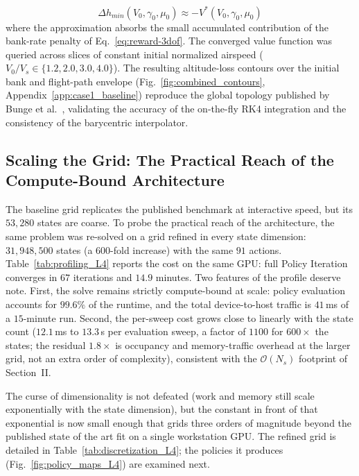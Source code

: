 \documentclass[journal ]{new-aiaa}
\begin{document}
\begin{equation}
    \Delta h_{min}(V_0, \gamma_0, \mu_0) \approx -V^*(V_0, \gamma_0, \mu_0)
\end{equation}
where the approximation absorbs the small accumulated contribution of the bank-rate penalty of Eq.~\eqref{eq:reward-3dof}. The converged value function was queried across slices of constant initial normalized airspeed ($V_0/V_s \in \{1.2, 2.0, 3.0, 4.0\}$). The resulting altitude-loss contours over the initial bank and flight-path envelope (Fig.~\ref{fig:combined_contours}, Appendix~\ref{app:case1_baseline}) reproduce the global topology published by Bunge et al.\ \cite{Bunge2018}, validating the accuracy of the on-the-fly RK4 integration and the consistency of the barycentric interpolator.

\subsection{Scaling the Grid: The Practical Reach of the Compute-Bound
Architecture}
\label{sec:scaling}

The baseline grid replicates the published benchmark at interactive
speed, but its $53{,}280$ states are coarse. To probe the practical
reach of the architecture, the same problem was re-solved on a grid
refined in every state dimension: $31{,}948{,}500$ states (a
$600$-fold increase) with the same $91$ actions.
Table~\ref{tab:profiling_L4} reports the cost on the same GPU: full
Policy Iteration converges in $67$ iterations and $14.9$ minutes.
Two features of the profile deserve note. First, the solve remains
strictly compute-bound at scale: policy evaluation accounts for
$99.6\%$ of the runtime, and the total device-to-host traffic is
$41$\,ms of a $15$-minute run. Second, the per-sweep cost grows
close to linearly with the state count ($12.1$\,ms to $13.3$\,s per
evaluation sweep, a factor of $1100$ for $600\times$ the states; the
residual $1.8\times$ is occupancy and memory-traffic overhead at the
larger grid, not an extra order of complexity), consistent with the
$\mathcal{O}(N_s)$ footprint of Section~II.

The curse of dimensionality is not defeated (work and memory still
scale exponentially with the state dimension), but the constant in
front of that exponential is now small enough that grids three orders
of magnitude beyond the published state of the art
\cite{Bunge2018} fit on a single workstation GPU. The refined grid is
detailed in Table~\ref{tab:discretization_L4}; the policies it
produces (Fig.~\ref{fig:policy_maps_L4}) are examined next.
\end{document}
